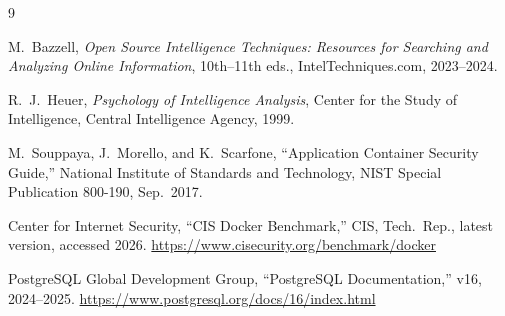 \documentclass[conference,a4paper,10pt]{IEEEtran}
\begin{document}
\begin{thebibliography}{9}

M.~Bazzell, \emph{Open Source Intelligence Techniques: Resources for
Searching and Analyzing Online Information}, 10th--11th eds.,
IntelTechniques.com, 2023--2024.

R.~J.~Heuer, \emph{Psychology of Intelligence Analysis}, Center for
the Study of Intelligence, Central Intelligence Agency, 1999.

M.~Souppaya, J.~Morello, and K.~Scarfone, ``Application Container
Security Guide,'' National Institute of Standards and Technology,
NIST Special Publication 800-190, Sep.\ 2017.

Center for Internet Security, ``CIS Docker Benchmark,'' CIS,
Tech.\ Rep., latest version, accessed 2026.
\url{https://www.cisecurity.org/benchmark/docker}

PostgreSQL Global Development Group, ``PostgreSQL Documentation,''
v16, 2024--2025. \url{https://www.postgresql.org/docs/16/index.html}

\end{thebibliography}
\end{document}
